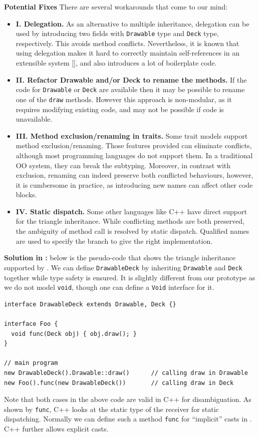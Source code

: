 \noindent\textbf{Potential Fixes} There are several workarounds that come to our mind:
\begin{itemize}
	\item \textbf{I. Delegation.} As an alternative to multiple inheritance,
	delegation can be used by introducing two fields with
	\lstinline|Drawable| type and \lstinline|Deck| type,
	respectively. This avoids method conflicts. Nevertheless, it is known
	that using delegation makes it hard to correctly maintain
	self-references  in an extensible system [], and also
	introduces a lot of boilerplate code.
	\item \textbf{II. Refactor Drawable and/or Deck to rename the methods.} If
	the code for \lstinline|Drawable| or \lstinline|Deck| are available
	then it may be possible to rename one of the \lstinline|draw|
	methods. However this approach is non-modular, as it requires 
	modifying existing code, and may not be possible if code is unavailable.
	\item \textbf{III. Method exclusion/renaming in traits.} Some trait models
	support method exclusion/renaming. Those features
	provided can eliminate conflicts, although most
	programming languages do not support them. In a traditional OO system,
	they can break the subtyping. Moreover, in
	contrast with exclusion, renaming can indeed preserve both conflicted
	behaviours, however, it is cumbersome in practice, as introducing new
	names can affect other code blocks.
	\item \textbf{IV. Static dispatch.} Some other languages like C++ have
	direct support for the triangle inheritance. While conflicting methods are
	both preserved, the ambiguity of method call is resolved by static dispatch.
	Qualified names are used to specify the branch to give the right implementation.
\end{itemize}

\noindent\textbf{Solution in \name{}:} below is the pseudo-code that shows the triangle
inheritance supported by \name{}.
We can define \lstinline|DrawableDeck| by inheriting \lstinline|Drawable| and \lstinline|Deck| together while
type safety is ensured. It is slightly different from our prototype as we do not model \lstinline|void|, though one can
define a \lstinline|Void| interface for it.
\vspace{3pt}\begin{lstlisting}
interface DrawableDeck extends Drawable, Deck {}

interface Foo {
  void func(Deck obj) { obj.draw(); }
}

// main program
new DrawableDeck().Drawable::draw()      // calling draw in Drawable
new Foo().func(new DrawableDeck())       // calling draw in Deck
\end{lstlisting}\vspace{3pt}
Note that both cases in the above code are valid in C++ for disambiguation. As shown by \lstinline|func|, C++ looks at
the static type of the receiver for static dispatching. Normally we can define such a method \lstinline|func| for ``implicit''
casts in \name{}. C++ further allows explicit casts.


